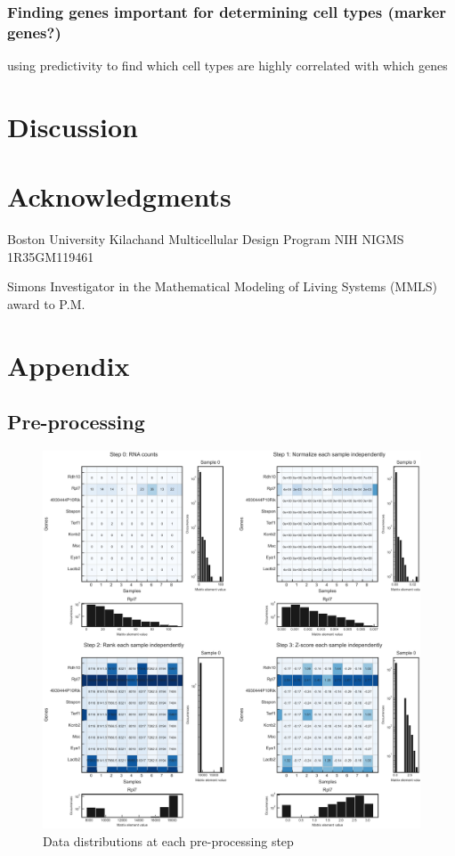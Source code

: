 \documentclass[aps,superscriptaddress, notitlepage,longbibliography]{revtex4-1}
\newcommand{\beginsupplement}{%
        \setcounter{table}{0}
        \renewcommand{\thetable}{S\arabic{table}}%
        \setcounter{figure}{0}
        \renewcommand{\thefigure}{S\arabic{figure}}%
     }
\begin{document}
\subsubsection{Finding genes important for determining cell types (marker genes?)}
using predictivity to find which cell types are highly correlated with which genes

\section{Discussion}



\section*{Acknowledgments}

Boston University Kilachand Multicellular Design Program NIH NIGMS 1R35GM119461

Simons Investigator in the Mathematical Modeling of Living Systems (MMLS) award to P.M.

\section*{Appendix}
\beginsupplement
\subsection{Pre-processing} \label{preprocessing}

\begin{figure}
	\centering
		\includegraphics[scale=0.6]{figs/fig1a supplement.pdf}
	\caption{Data distributions at each pre-processing step}
	\label{FIG:supp1}
\end{figure}
\end{document}
